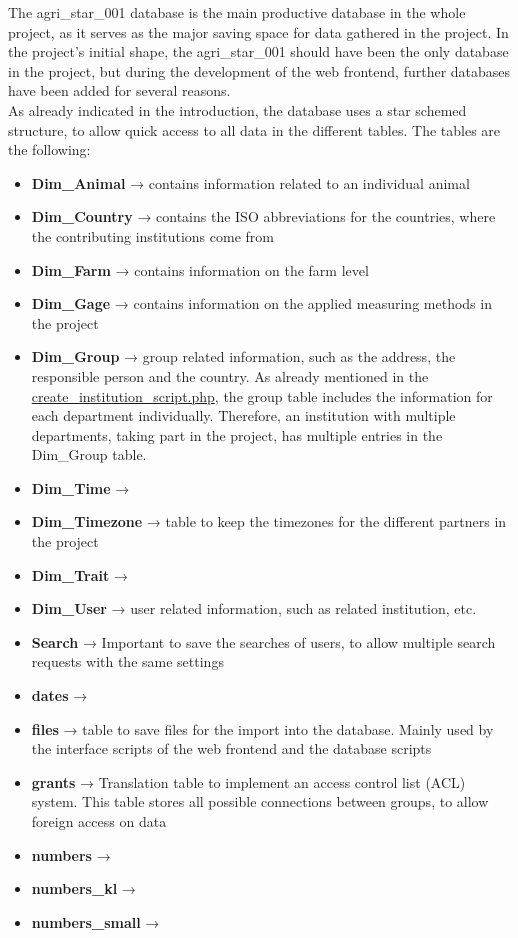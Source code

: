 The agri\_star\_001 database is the main productive database in the whole project, as it serves as the major saving space for data gathered in the project. In the project's initial 
shape, the agri\_star\_001 should have been the only database in the project, but during the development of the web frontend, further databases have been added for several 
reasons.\\
As already indicated in the introduction, the database uses a star schemed structure, to allow quick access to all data in the different tables. The tables are the following:
\begin{itemize}
 \item \textbf{Dim\_Animal} → contains information related to an individual animal
 \item \textbf{Dim\_Country} → contains the ISO abbreviations for the countries, where the contributing institutions come from
 \item \textbf{Dim\_Farm} → contains information on the farm level
 \item \textbf{Dim\_Gage} → contains information on the applied measuring methods in the project
 \item \textbf{Dim\_Group} → group related information, such as the address, the responsible person and the country. As already mentioned in the 
 \hyperref[create_institution_script.php]{create\_institution\_script.php}, the group table includes the information for each department individually. Therefore, an institution 
 with multiple departments, taking part in the project, has multiple entries in the Dim\_Group table.
 \item \textbf{Dim\_Time} →
 \item \textbf{Dim\_Timezone} → table to keep the timezones for the different partners in the project
 \item \textbf{Dim\_Trait} →
 \item \textbf{Dim\_User} → user related information, such as related institution, etc.
 \item \textbf{Search} → Important to save the searches of users, to allow multiple search requests with the same settings
 \item \textbf{dates} →
 \item \textbf{files} → table to save files for the import into the database. Mainly used by the interface scripts of the web frontend and the database scripts
 \item \textbf{grants} → Translation table to implement an access control list (ACL) system. This table stores all possible connections between groups, to allow foreign access on 
 data
 \item \textbf{numbers} →
 \item \textbf{numbers\_kl} →
 \item \textbf{numbers\_small} →
\end{itemize}

